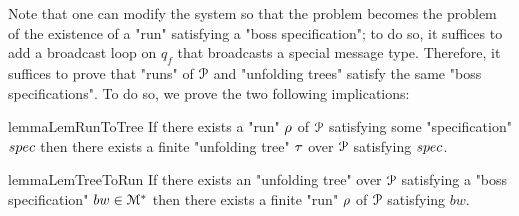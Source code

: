 

Note that one can modify the system so that the \COVER problem becomes the problem of the existence of a "run" satisfying a "boss specification"; to do so, it suffices to add a broadcast loop on $q_f$ that broadcasts a special message type. Therefore, it suffices to prove that "runs" of $\mathcal{P}$ and "unfolding trees" satisfy the same "boss specifications". To do so, we prove the two following implications:

\begin{restatable}{lemma}{LemRunToTree}
	\label{lem:run-to-tree}
	If there exists a "run" $\rho$ of $\mathcal{P}$ satisfying some "specification" $\spec$ then there exists a finite "unfolding tree" $\tau$ over $\mathcal{P}$ satisfying $\spec$.
\end{restatable}

\begin{restatable}{lemma}{LemTreeToRun}
	\label{lem:tree-to-run}
	If there exists an "unfolding tree" over $\mathcal{P}$ satisfying a "boss specification" $bw \in \mathcal{M}^*$ then there exists a finite "run" $\rho$ of $\mathcal{P}$ satisfying $bw$.
\end{restatable}


	

